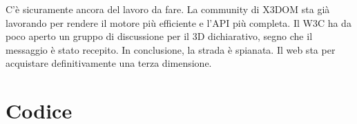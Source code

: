 \documentclass[a4paper,12pt]{report}
\begin{document}
C'è sicuramente ancora del lavoro da fare. La community di X3DOM sta già lavorando per rendere il motore più efficiente e l'API più completa. Il W3C ha da poco aperto un gruppo di discussione per il 3D dichiarativo, segno che il messaggio è stato recepito. In conclusione, la strada è spianata. Il web sta per acquistare definitivamente una terza dimensione.
\newpage
{}
\begin{thebibliography}{99}


\end{thebibliography}
\appendix
\linespread{1}
\chapter{Codice}

\def\baselinestretch{0.7}
\def\baselinestretch{1}
\end{document}
